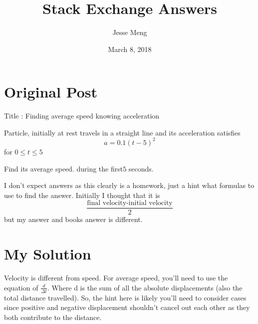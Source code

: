 \documentclass{article}
\title{Stack Exchange Answers}
\author{Jesse Meng }
\date{March 8, 2018}
\begin{document}
\maketitle

\section{Original Post}
Title : Finding average speed knowing acceleration

Particle, initially at rest travels in a straight line and its acceleration satisfies $$a=0.1(t-5)^2 $$for $0\leq t\leq5$

Find its average speed. during the first$5$ seconds.

I don't expect answers as this clearly is a homework, just a hint what formulas to use to find the answer. Initially I thought that it is $$\frac{\text{final velocity-initial velocity}}{2}$$
but my answer and books answer is different.
\section{My Solution}
Velocity is different from speed. For average speed, you'll need to use the equation of $\frac{d}{\Delta t}$. Where d is the sum of all the absolute displacements (also the total distance travelled). So, the hint here is likely you'll need to consider cases since positive and negative displacement shouldn't cancel out each other as they both contribute to the distance.
\end{document}
